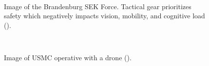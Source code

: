 \begin{figure}[htb]
\centering
{}\\
\caption{\label{sek}{Image of the Brandenburg SEK Force. Tactical gear prioritizes safety which negatively impacts vision, mobility, and cognitive load (\cite{BradSEK}). }}
\end{figure}
\bigskip



\begin{figure}[htb]
\centering
{}\\
\caption{\label{usmc}{Image of USMC operative with a drone (\cite{USMC1}). }}
\end{figure}


\newpage








